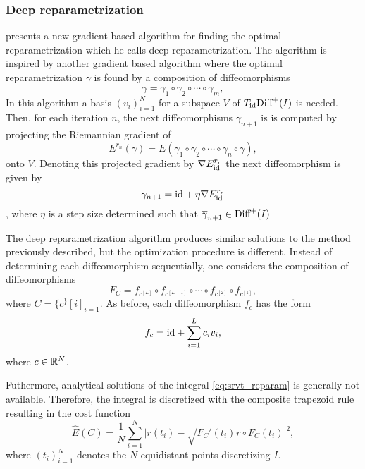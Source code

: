 \subsubsection{Deep reparametrization}
\citeauthor{jørgen2021} \cite{jørgen2021} presents a new gradient based algorithm for finding the optimal reparametrization which he calls deep reparametrization. The algorithm is inspired by another gradient based algorithm where the optimal reparametrization \(\overline \gamma\) is found by a composition of diffeomorphisms
\begin{equation}
  \overline \gamma = \gamma_1 \circ \gamma_2 \circ \cdots  \circ \gamma_m, 
\end{equation}
In this algorithm a basis \({(v_i)}_{i=1}^{N}\) for a subspace \(V\) of \( T_{\text{id}}\text{Diff}^+(I)\) is needed. Then, for each iteration \(n\), the next diffeomorphisms \(\gamma_{n+1}\) is is computed by projecting the Riemannian gradient of 
\begin{equation}
  E^{r_n}(\gamma) = E(\gamma_1 \circ \gamma_2 \circ \cdots  \circ \gamma_n \circ \gamma),   
\end{equation}
onto \(V\). Denoting this projected gradient by \(\nabla E_{\text{id}}^{r_r}\) the next diffeomorphism is given by 
\begin{equation}
  \gamma_{n+1} = \text{id} + \eta \nabla E_{\text{id}}^{r_r} 
\end{equation}
, where \(\eta\) is a step size determined such that \(\overline \gamma_{n+1} \in \text{Diff}^+(I)\) 

The deep reparametrization algorithm produces similar solutions to the method previously described, but the optimization procedure is different. Instead of determining each diffeomorphism sequentially, one considers the composition of diffeomorphisms 
\begin{equation}
  F_{C} = f_{c^{[L]}}\circ f_{c^{[L-1]}} \circ \cdots \circ f_{c^{[2]}} \circ f_{c^{[1]}},
\end{equation}
where \(C = \{c^\}{[i]}_{i=1}\). As before, each diffeomorphism \(f_{c}\) has the form 
\begin{equation}
  f_{c}= \text{id} +  \sum_{i=1}^{L} c_i v_i, 
\end{equation}
where \(c \in \mathbb{R}^N \). 

Futhermore, analytical solutions of the integral \eqref{eq:srvt_reparam} is generally not available. Therefore, the integral is discretized with the composite trapezoid rule resulting in the cost function 
\begin{equation}\label{eq:discretized_cost}
  \hat E(C) = \frac{1}{N} \sum_{i = 1}^N {\vert r(t_i)- \sqrt{ F_C'(t_i)}r \circ F_C(t_i) \vert^2}, 
\end{equation}
where \({(t_i)}_{i=1}^N\) denotes the \(N\) equidistant points discretizing \(I\). 

